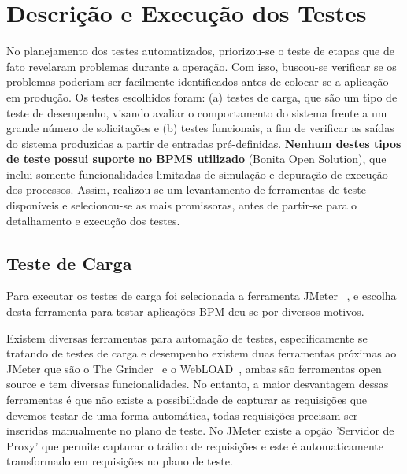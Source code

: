\documentclass[12pt]{article}
\begin{document}
\section{Descrição e Execução dos Testes}

No planejamento dos testes automatizados, priorizou-se o teste de  etapas que de fato revelaram problemas durante a operação. Com isso, buscou-se verificar se os problemas poderiam ser facilmente identificados antes de colocar-se a aplicação em produção. Os testes escolhidos foram: (a) testes de carga, que são um tipo de teste de desempenho, visando avaliar o comportamento do sistema frente a um grande número de solicitações e (b) testes funcionais, a fim de verificar as saídas do sistema produzidas a partir de entradas pré-definidas. \textbf{Nenhum destes tipos de teste possui suporte no BPMS utilizado} (Bonita Open Solution), que inclui somente funcionalidades limitadas de simulação e depuração de execução dos processos. Assim, realizou-se um levantamento de ferramentas de teste disponíveis e selecionou-se as mais promissoras, antes de partir-se para o detalhamento e execução dos testes.

\subsection{Teste de Carga}
Para executar os testes de carga foi selecionada a ferramenta JMeter ~\cite{JMETER}, e escolha desta ferramenta para testar aplicações BPM deu-se por diversos motivos.

Existem diversas ferramentas para automação de testes, especificamente se tratando de testes de carga e desempenho existem duas ferramentas próximas ao JMeter que são o The Grinder~\cite{GRINDER} e o WebLOAD~\cite{WEBLOAD}, ambas são ferramentas open source e tem diversas funcionalidades. No entanto, a maior desvantagem dessas ferramentas é que não existe a possibilidade de capturar as requisições que devemos testar de uma forma automática, todas requisições precisam ser inseridas manualmente no plano de teste. No JMeter existe a opção 'Servidor de Proxy' que permite capturar o tráfico de requisições e este é automaticamente transformado em requisições no plano de teste.
\end{document}

